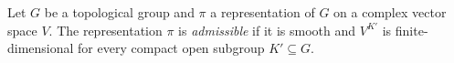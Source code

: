 Let $G$ be a topological group and $\pi$ a representation of $G$ on a complex vector space $V$. The representation
$\pi$ is \emph{admissible} if it is smooth and $V^{K'}$ is finite-dimensional for every compact open subgroup
$K'\subseteq G$.
